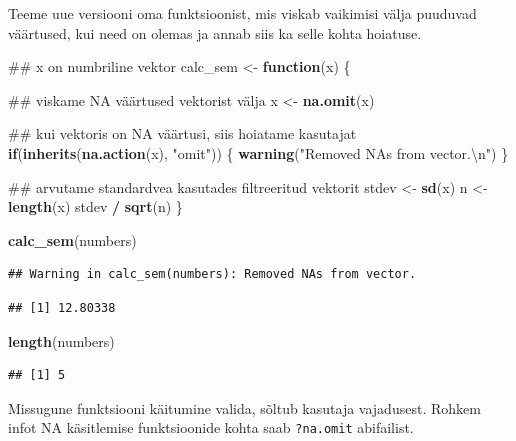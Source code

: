 \documentclass[]{book}
\newenvironment{Shaded}{\begin{snugshade}}{\end{snugshade}}
\newcommand{\KeywordTok}[1]{\textcolor[rgb]{0.13,0.29,0.53}{\textbf{#1}}}
\newcommand{\CharTok}[1]{\textcolor[rgb]{0.31,0.60,0.02}{#1}}
\newcommand{\StringTok}[1]{\textcolor[rgb]{0.31,0.60,0.02}{#1}}
\newcommand{\ControlFlowTok}[1]{\textcolor[rgb]{0.13,0.29,0.53}{\textbf{#1}}}
\newcommand{\OperatorTok}[1]{\textcolor[rgb]{0.81,0.36,0.00}{\textbf{#1}}}
\newcommand{\NormalTok}[1]{#1}
\begin{document}
Teeme uue versiooni oma funktsioonist, mis viskab vaikimisi välja
puuduvad väärtused, kui need on olemas ja annab siis ka selle kohta
hoiatuse.

\begin{Shaded}
\begin{Highlighting}[]
\NormalTok{## x on numbriline vektor}
\NormalTok{calc_sem <-}\StringTok{ }\ControlFlowTok{function}\NormalTok{(x) \{}
  
\NormalTok{  ## viskame NA väärtused vektorist välja}
\NormalTok{  x <-}\StringTok{ }\KeywordTok{na.omit}\NormalTok{(x)}
  
\NormalTok{  ## kui vektoris on NA väärtusi, siis hoiatame kasutajat}
  \ControlFlowTok{if}\NormalTok{(}\KeywordTok{inherits}\NormalTok{(}\KeywordTok{na.action}\NormalTok{(x), }\StringTok{"omit"}\NormalTok{)) \{}
    \KeywordTok{warning}\NormalTok{(}\StringTok{"Removed NAs from vector.}\CharTok{\textbackslash{}n}\StringTok{"}\NormalTok{)}
\NormalTok{  \}}
  
\NormalTok{  ## arvutame standardvea kasutades filtreeritud vektorit}
\NormalTok{  stdev <-}\StringTok{ }\KeywordTok{sd}\NormalTok{(x)}
\NormalTok{  n <-}\StringTok{ }\KeywordTok{length}\NormalTok{(x)}
\NormalTok{  stdev }\OperatorTok{/}\StringTok{ }\KeywordTok{sqrt}\NormalTok{(n)}
\NormalTok{\}}

\KeywordTok{calc_sem}\NormalTok{(numbers)}
\end{Highlighting}
\end{Shaded}

\begin{verbatim}
## Warning in calc_sem(numbers): Removed NAs from vector.
\end{verbatim}

\begin{verbatim}
## [1] 12.80338
\end{verbatim}

\begin{Shaded}
\begin{Highlighting}[]
\KeywordTok{length}\NormalTok{(numbers)}
\end{Highlighting}
\end{Shaded}

\begin{verbatim}
## [1] 5
\end{verbatim}

Missugune funktsiooni käitumine valida, sõltub kasutaja vajadusest.
Rohkem infot NA käsitlemise funktsioonide kohta saab \texttt{?na.omit}
abifailist.
\end{document}
